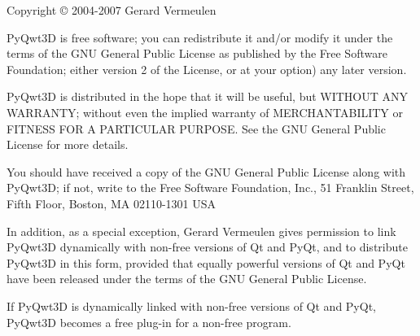 Copyright \copyright{} 2004-2007 Gerard Vermeulen

PyQwt3D is free software; you can redistribute it and/or modify
it under the terms of the GNU General Public License as published by
the Free Software Foundation; either version 2 of the License, or
at your option) any later version.

PyQwt3D is distributed in the hope that it will be useful,
but WITHOUT ANY WARRANTY; without even the implied warranty of
MERCHANTABILITY or FITNESS FOR A PARTICULAR PURPOSE.  See the
GNU General Public License for more details.

You should have received a copy of the GNU General Public License along
with PyQwt3D; if not, write to the Free Software Foundation, Inc.,
51 Franklin Street, Fifth Floor, Boston, MA  02110-1301  USA

In addition, as a special exception, Gerard Vermeulen gives permission
to link PyQwt3D dynamically with non-free versions of Qt and PyQt,
and to distribute PyQwt3D in this form, provided that equally powerful
versions of Qt and PyQt have been released under the terms of the GNU
General Public License.

If PyQwt3D is dynamically linked with non-free versions of Qt and PyQt,
PyQwt3D becomes a free plug-in for a non-free program.


